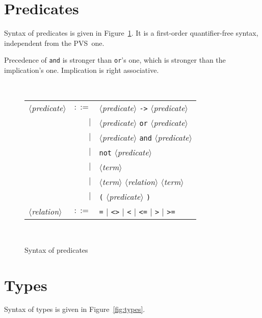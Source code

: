 \documentclass[a4paper,12pt]{report}
\newcommand{\pvs}{\textsf{PVS}}
\newcommand{\te}[1]{\texttt{#1}}
\newcommand{\nt}[1]{$\langle$\textsl{#1}$\rangle$}
\begin{document}
\section{Predicates}

Syntax of predicates is given in Figure~\ref{fig:predicates}.
It is a first-order quantifier-free syntax, independent from the \pvs\ one.

Precedence of \te{and} is stronger than \te{or}'s one, which is
stronger than the implication's one. Implication is right associative.

\begin{figure}[htbp]
\begin{center}
\hrulefill\\
\begin{tabular}{lrl}
  \nt{predicate}
    & $::=$ & \nt{predicate} \te{->} \nt{predicate} \\
      & $|$ & \nt{predicate} \te{or} \nt{predicate} \\
      & $|$ & \nt{predicate} \te{and} \nt{predicate} \\
      & $|$ & \te{not} \nt{predicate} \\
      & $|$ & \nt{term} \\
      & $|$ & \nt{term} \nt{relation} \nt{term} \\
      & $|$ & \te{(} \nt{predicate} \te{)}
  \\[0.1em]

  \nt{relation}
    & $::=$ & \te{=} $|$ \te{<>} $|$ 
              \te{<} $|$ \te{<=} $|$ \te{>} $|$ \te{>=}
\end{tabular}\\
\hrulefill
\caption{Syntax of predicates}
\label{fig:predicates}
\end{center}            
\end{figure}

\section{Types}

Syntax of types is given in Figure~\ref{fig:types}.
\end{document}
